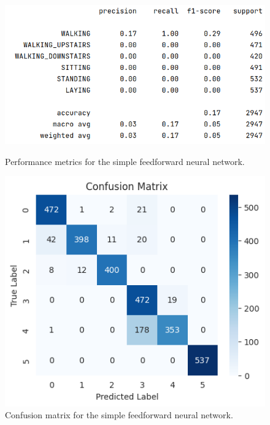 \begin{figure}[ht]
    \centering
    \begin{minipage}{0.45\textwidth}
        \centering
        \includegraphics[width=\textwidth]{./img/ffnn/simple/performance-metrics}
        \caption{Performance metrics for the simple feedforward neural network.}
        \label{fig:ffnn-simple-performance-metrics}
    \end{minipage}\hfill
    \begin{minipage}{0.45\textwidth}
        \centering
        \includegraphics[width=\textwidth]{./img/ffnn/simple/confusion-matrix}
        \caption{ Confusion matrix for the simple feedforward neural network.}
        \label{fig:ffnn-simple-confusion-matrix}
    \end{minipage}
\end{figure}

